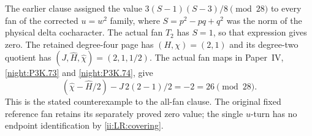 \begin{refuted}\label{night:P3K.36}\label{stmt:P3K.36}
The earlier clause assigned the value
$3(S-1)(S-3)/8\pmod {28}$ to every fan of the corrected
$u=w^2$ family, where $S=p^2-pq+q^2$ was the norm of the
physical delta cocharacter. The actual fan $T_2$ has $S=1$,
so that expression gives zero. The retained degree-four
page has $(H,\chi)=(2,1)$ and its degree-two quotient has
$(J,\widehat H,\widehat\chi)=(2,1,1/2)$.
The actual fan maps in Paper~IV, \ref{night:P3K.73} and
\ref{night:P3K.74}, give
\[
 (\widehat\chi-\widehat H/2)-J\,2(2-1)/2
                           =-2=26\pmod {28}.
\]
This is the stated counterexample to the all-fan clause.
The original fixed reference fan retains its separately
proved zero value; the single $u$-turn has no endpoint
identification by \ref{ii:LR:covering}.
\end{refuted}
